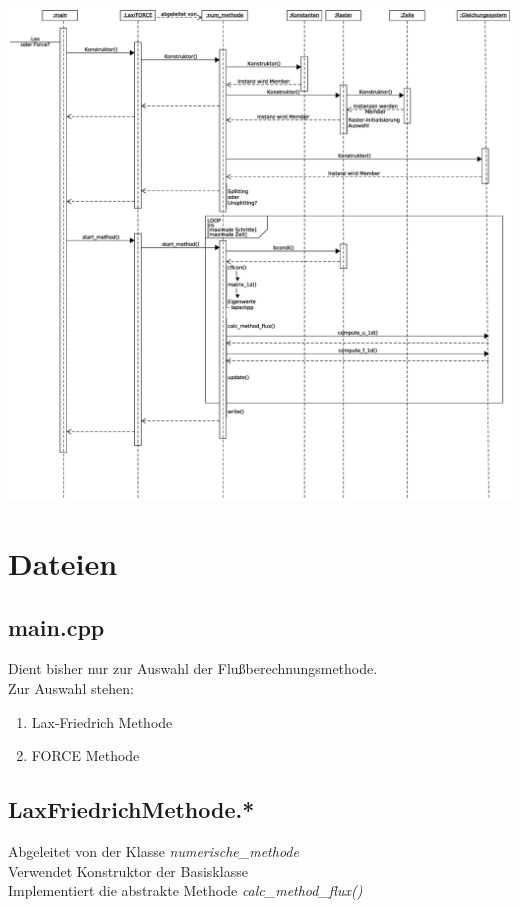 \documentclass[12pt]{article}
\begin{document}
\includegraphics[scale=0.3]{multiflow_sequenz}

\renewcommand{\labelenumi}{\alph{enumi})} 

\section{Dateien}
\subsection{main.cpp}
Dient bisher nur zur Auswahl der Flußberechnungsmethode. \\
Zur Auswahl stehen:
\begin{enumerate}
	\item Lax-Friedrich Methode
	\item FORCE Methode
\end{enumerate}

\subsection{LaxFriedrichMethode.*}
Abgeleitet von der Klasse {\em numerische\_methode}\\
Verwendet Konstruktor der Basisklasse \\
Implementiert die abstrakte Methode {\em calc\_method\_flux()} \\
\end{document}
